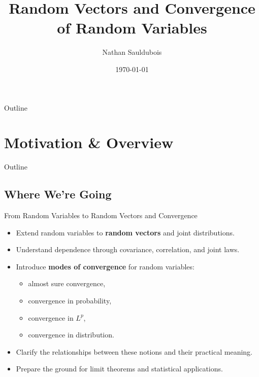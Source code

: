 \documentclass[aspectratio=169]{beamer}
\title{Random Vectors and Convergence of Random Variables}
\institute{NYU Tandon School, Finance and Risk Engineering}
\author{Nathan Sauldubois}
\date{\today}
\begin{document}
\maketitle

\begin{frame}{Outline}
  \tableofcontents[hideallsubsections]
\end{frame}

\section{Motivation \& Overview}

\begin{frame}{Outline}
\end{frame}

\subsection{Where We're Going}

\begin{frame}{From Random Variables to Random Vectors and Convergence}

\begin{itemize}
  \item Extend random variables to \textbf{random vectors} and joint distributions.
  \item Understand dependence through covariance, correlation, and joint laws.
  \item Introduce \textbf{modes of convergence} for random variables:
  \begin{itemize}
    \item almost sure convergence,
    \item convergence in probability,
    \item convergence in \(L^p\),
    \item convergence in distribution.
  \end{itemize}
  \item Clarify the relationships between these notions and their practical meaning.
  \item Prepare the ground for limit theorems and statistical applications.
\end{itemize}

\end{frame}
\end{document}

